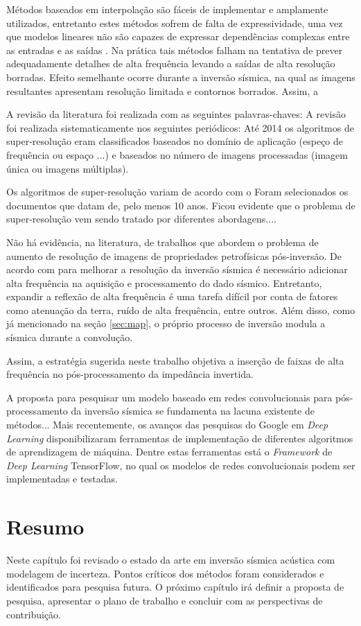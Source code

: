 Métodos baseados em interpolação são fáceis de implementar e amplamente utilizados,
entretanto estes métodos sofrem de falta de expressividade, uma vez que modelos lineares
não são capazes de expressar dependências complexas entre as entradas e as saídas \citep{HsiehAndrews1978}.
Na prática tais métodos falham na tentativa de prever adequadamente detalhes de alta frequência
levando a saídas de alta resolução borradas. Efeito semelhante ocorre durante a inversão sísmica,
na qual as imagens resultantes apresentam resolução limitada e contornos borrados. Assim,
a 

A revisão da literatura foi realizada com as seguintes palavras-chaves:
A revisão foi realizada sistematicamente nos seguintes periódicos:
Até 2014 os algoritmos de super-resolução eram classificados baseados
no domínio de aplicação (espeço de frequência ou espaço ...) e baseados
no número de imagens processadas (imagem única ou imagens múltiplas).

Os algoritmos de super-resolução variam de acordo com o 
Foram selecionados os documentos que datam de, pelo menos 10 anos. Ficou evidente que o problema
de super-resolução vem sendo tratado por diferentes abordagens....


Não há evidência, na literatura, de trabalhos que abordem o problema de aumento de resolução
de imagens de propriedades petrofísicas pós-inversão. De acordo com \cite{Xiaoyu2012}
para melhorar a resolução da inversão sísmica é necessário adicionar alta frequência
na aquisição e processamento do dado sísmico. Entretanto, expandir a reflexão de alta frequência é uma tarefa
difícil por conta de fatores como atenuação da terra, ruído de alta frequência, 
entre outros. Além disso, como já mencionado na seção \ref{sec:map}, o próprio processo
de inversão modula a sísmica durante a convolução.

Assim, a estratégia sugerida neste
trabalho objetiva a inserção de faixas de alta frequência no pós-processamento da impedância
invertida.


A proposta para pesquisar um modelo baseado em redes convolucionais para pós-processamento
da inversão sísmica se fundamenta na lacuna existente de métodos...
Mais recentemente, os avanços das pesquisas do Google em \textit{Deep Learning} disponibilizaram
ferramentas de implementação de diferentes algoritmos de aprendizagem de máquina. Dentre estas
ferramentas está o \textit{Framework} de \textit{Deep Learning} TensorFlow, no qual os modelos
de redes convolucionais podem ser implementadas e testadas.


\section{Resumo}

Neste capítulo foi revisado o estado da arte em inversão sísmica acústica
com modelagem de incerteza. Pontos críticos dos métodos foram considerados e
identificados para pesquisa futura. O próximo capítulo irá definir a proposta de
pesquisa, apresentar o plano de trabalho e concluir com as perspectivas de
contribuição.
